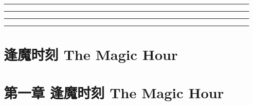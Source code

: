 \documentclass[oneside,11pt]{memoir} %
\begin{document}
\begin{CJK}{UTF8}{gbsn}

\thispagestyle{empty} %
\noindent {\fontsize{24.88}{2}\selectfont
\bfseries\textcolor{black}{An Unfailing Summer}}
\newpage %
\rule{-3pt}{30pt}
\rule{-3pt}{30pt}
\rule{-3pt}{30pt}
\rule{-3pt}{30pt}

\newpage
\chapter{逢魔时刻  The Magic Hour}
\newpage
\chapter*{第一章 逢魔时刻  The Magic Hour}


\end{CJK}
\end{document}
